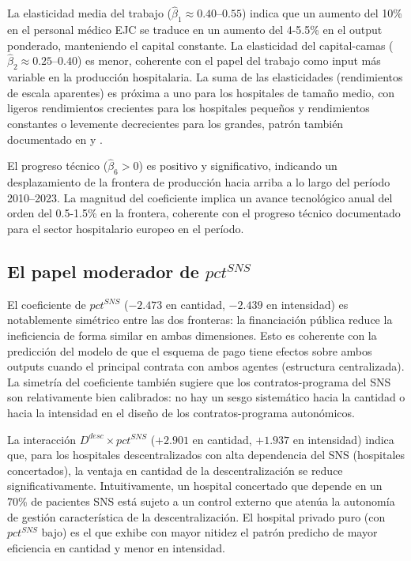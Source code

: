 \documentclass[12pt, a4paper, twoside, openright]{book}
\theoremstyle{plain}
\theoremstyle{definition}
\theoremstyle{remark}
\begin{document}
La elasticidad media del trabajo ($\hat{\beta}_1 \approx 0.40$--$0.55$) indica que un aumento del 10\% en el personal médico EJC se traduce en un aumento del 4-5.5\% en el output ponderado, manteniendo el capital constante. La elasticidad del capital-camas ($\hat{\beta}_2 \approx 0.25$--$0.40$) es menor, coherente con el papel del trabajo como input más variable en la producción hospitalaria. La suma de las elasticidades (rendimientos de escala aparentes) es próxima a uno para los hospitales de tamaño medio, con ligeros rendimientos crecientes para los hospitales pequeños y rendimientos constantes o levemente decrecientes para los grandes, patrón también documentado en \citet{linna1998} y \citet{farsi2005}.

El progreso técnico ($\hat{\beta}_6 > 0$) es positivo y significativo, indicando un desplazamiento de la frontera de producción hacia arriba a lo largo del período 2010--2023. La magnitud del coeficiente implica un avance tecnológico anual del orden del 0.5-1.5\% en la frontera, coherente con el progreso técnico documentado para el sector hospitalario europeo en el período.

\subsection{El papel moderador de \texorpdfstring{$pct^{SNS}$}{pct\^{}SNS}}

El coeficiente de $pct^{SNS}$ ($-2.473$ en cantidad, $-2.439$ en intensidad) es notablemente simétrico entre las dos fronteras: la financiación pública reduce la ineficiencia de forma similar en ambas dimensiones. Esto es coherente con la predicción del modelo de que el esquema de pago tiene efectos sobre ambos outputs cuando el principal contrata con ambos agentes (estructura centralizada). La simetría del coeficiente también sugiere que los contratos-programa del SNS son relativamente bien calibrados: no hay un sesgo sistemático hacia la cantidad o hacia la intensidad en el diseño de los contratos-programa autonómicos.

La interacción $D^{desc}\times pct^{SNS}$ ($+2.901$ en cantidad, $+1.937$ en intensidad) indica que, para los hospitales descentralizados con alta dependencia del SNS (hospitales concertados), la ventaja en cantidad de la descentralización se reduce significativamente. Intuitivamente, un hospital concertado que depende en un 70\% de pacientes SNS está sujeto a un control externo que atenúa la autonomía de gestión característica de la descentralización. El hospital privado puro (con $pct^{SNS}$ bajo) es el que exhibe con mayor nitidez el patrón predicho de mayor eficiencia en cantidad y menor en intensidad.
\end{document}
